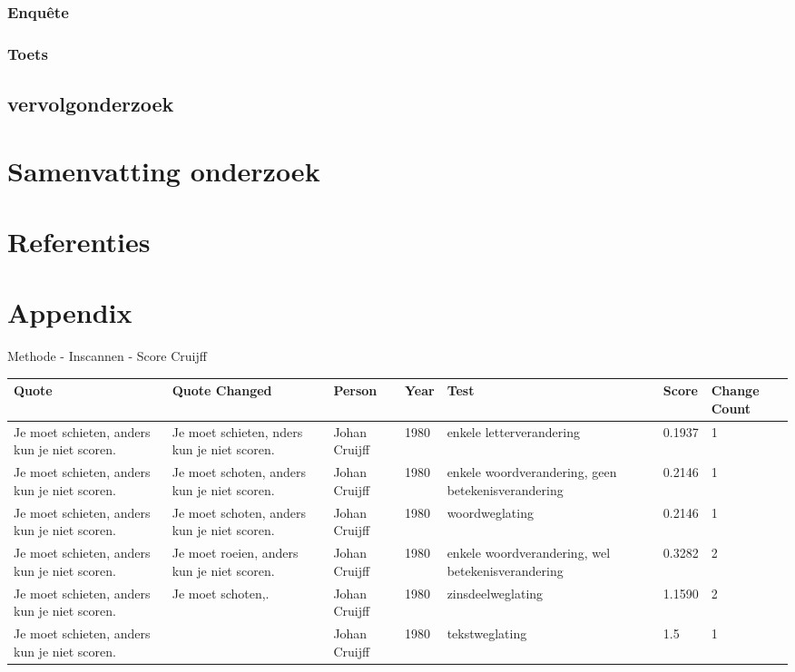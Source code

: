 \documentclass[12pt]{article}
\begin{document}
\subsubsection{Enquête}


\subsubsection{Toets}

\pagebreak
\subsection{vervolgonderzoek}

\section{Samenvatting onderzoek}

\section{Referenties}
\section{Appendix} %

\Large Methode - Inscannen - Score
\noindent\large Cruijff
\small
\begin{longtable}{|p{}|p{}|p{}|p{}|p{}|p{}|p{}|}
\hline
\textbf{Quote} & \textbf{Quote Changed} & \textbf{Person} & \textbf{Year} & \textbf{Test} & \textbf{Score} & \textbf{Change Count} \\
\hline
\endhead
%
\endfoot
%
Je moet schieten, anders kun je niet scoren. & Je moet schieten, nders kun je niet scoren. & Johan Cruijff & 1980 & enkele letterverandering & 0.1937 & 1 \\
\hline
Je moet schieten, anders kun je niet scoren. & Je moet schoten, anders kun je niet scoren. & Johan Cruijff & 1980 & enkele woordverandering, geen betekenisverandering & 0.2146 & 1 \\
\hline
Je moet schieten, anders kun je niet scoren. & Je moet schoten, anders kun je niet scoren. & Johan Cruijff & 1980 & woordweglating & 0.2146 & 1 \\
\hline
Je moet schieten, anders kun je niet scoren. & Je moet roeien, anders kun je niet scoren. & Johan Cruijff & 1980 & enkele woordverandering, wel betekenisverandering & 0.3282 & 2 \\
\hline
Je moet schieten, anders kun je niet scoren. & Je moet schoten,. & Johan Cruijff & 1980 & zinsdeelweglating & 1.1590 & 2 \\
\hline
Je moet schieten, anders kun je niet scoren. &  & Johan Cruijff & 1980 & tekstweglating & 1.5 & 1 \\
\hline
\end{longtable}
\end{document}
